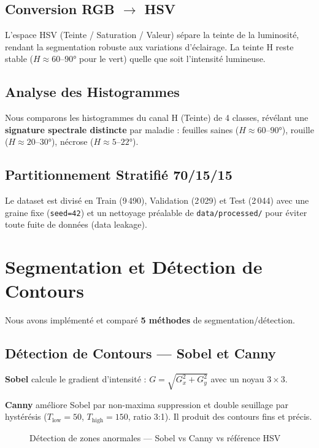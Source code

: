 \documentclass[12pt,a4paper]{article}
\begin{document}
\subsection{Conversion RGB $\rightarrow$ HSV}
L'espace HSV (Teinte / Saturation / Valeur) sépare la teinte de la luminosité, 
rendant la segmentation robuste aux variations d'éclairage. La teinte H reste 
stable ($H \approx 60$--$90°$ pour le vert) quelle que soit l'intensité lumineuse.

\subsection{Analyse des Histogrammes}
Nous comparons les histogrammes du canal H (Teinte) de 4 classes, révélant une 
\textbf{signature spectrale distincte} par maladie : feuilles saines ($H \approx 60$--$90°$), 
rouille ($H \approx 20$--$30°$), nécrose ($H \approx 5$--$22°$).

\subsection{Partitionnement Stratifié 70/15/15}
Le dataset est divisé en Train (9\,490), Validation (2\,029) et Test (2\,044) 
avec une graine fixe (\texttt{seed=42}) et un nettoyage préalable de \texttt{data/processed/} 
pour éviter toute fuite de données (data leakage).

\section{Segmentation et Détection de Contours}

Nous avons implémenté et comparé \textbf{5 méthodes} de segmentation/détection.

\subsection{Détection de Contours — Sobel et Canny}

\textbf{Sobel} calcule le gradient d'intensité : $G = \sqrt{G_x^2 + G_y^2}$ 
avec un noyau $3\times3$.

\textbf{Canny} améliore Sobel par non-maxima suppression et double seuillage par 
hystérésis ($T_{\text{low}}=50$, $T_{\text{high}}=150$, ratio 3:1). Il produit 
des contours fins et précis.

\begin{figure}[H]
\centering
{}
\caption{Détection de zones anormales — Sobel vs Canny vs référence HSV}
\end{figure}
\end{document}
